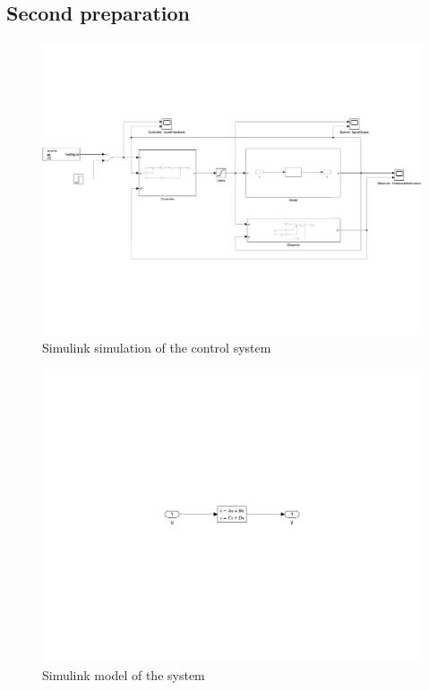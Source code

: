 \subsection{Second preparation} \label{appendix:secondpreparation}
\FloatBarrier
\begin{figure}[ht]
	\begin{center}
		\includegraphics[clip, trim=0cm 5cm 0cm 5cm, width=1\textwidth]{simulink/simulinkSimulation.pdf}
		\caption[Simulink simulation of the control system]{Simulink simulation of the control system}
		\label{fig:simuSimulation}
	\end{center}
\end{figure}
\FloatBarrier

\FloatBarrier
\begin{figure}[ht]
	\begin{center}
		\includegraphics[clip, trim=0cm 10cm 0cm 8cm, width=1\textwidth]{simulink/simulinkModel.pdf}
		\caption[Simulink model of the system]{Simulink model of the system}
		\label{fig:simuModel}
	\end{center}
\end{figure}
\FloatBarrier

